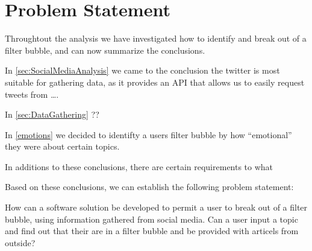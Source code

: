 \section{Problem Statement}

Throughtout the analysis we have investigated how to identify and break out of a
filter bubble, and can now summarize the conclusions.\nl

In \autoref{sec:SocialMediaAnalysis} we came to the conclusion the twitter is
most suitable for gathering data, as it provides an API that allows us to easily
request tweets from \ldots {}.\nl

In \autoref{sec:DataGathering} ??\nl

In \autoref{emotions} we decided to identifty a users filter bubble by how
``emotional'' they were about certain topics.\nl

In additions to these conclusions, there are certain requirements to what 


Based on these conclusions, we can establish the following problem statement:



How can a software solution be developed to permit a user to break out of a
filter bubble, using information gathered from social media.
Can a user input a topic and find out that their are in a filter bubble and be
provided with articels from outside?